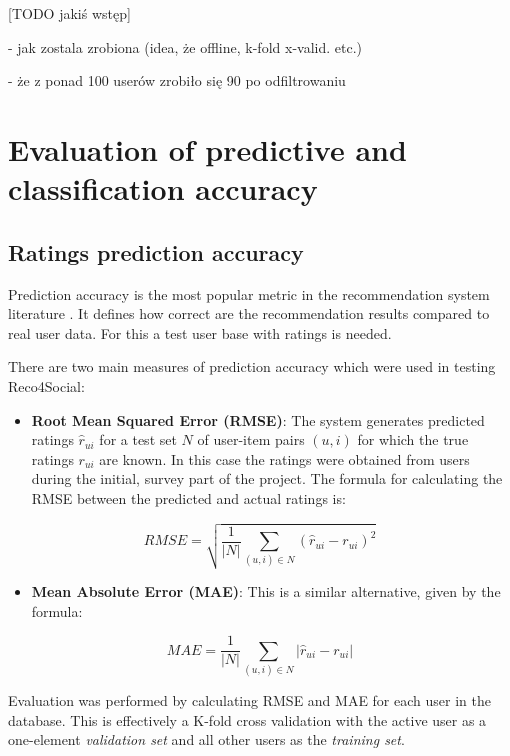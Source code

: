 \documentclass[12pt]{report}
\begin{document}
[TODO jakiś wstęp]

- jak zostala zrobiona (idea, że offline, k-fold x-valid. etc.)

- że z ponad 100 userów zrobiło się 90 po odfiltrowaniu

\section{Evaluation of predictive and classification accuracy}

\subsection{Ratings prediction accuracy}

Prediction accuracy is the most popular metric in the recommendation system literature \cite{eval_microsoft}. It defines how correct are the recommendation results compared to real user data. For this a test user base with ratings is needed. 

There are two main measures of prediction accuracy which were used in testing Reco4Social:
\begin{itemize}
\item {\bf Root Mean Squared Error (RMSE)}: The system generates predicted ratings $\hat{r}_{ui}$ for a test set $N$ of user-item pairs $(u,i)$ for which the true ratings $r_{ui}$ are known. In this case the ratings were obtained from users during the initial, survey part of the project. The formula for calculating the RMSE between the predicted and actual ratings is:
\end{itemize}

\begin{equation}
RMSE = \sqrt{\frac{1}{|N|} \displaystyle\sum_{(u,i) \in N} (\hat{r}_{ui} - r_{ui})^2 }
\label{eq.rmse}
\end{equation}
\hbox{}

\begin{itemize}
\item {\bf Mean Absolute Error (MAE)}: This is a similar alternative, given by the formula:
\end{itemize}

\begin{equation}
MAE = \frac{1}{|N|} \displaystyle\sum_{(u,i) \in N} |\hat{r}_{ui} - r_{ui}|
\label{eq.mae}
\end{equation}
\hbox{}

Evaluation was performed by calculating RMSE and MAE for each user in the database. This is effectively a K-fold cross validation with the active user as a one-element \textit{validation set} and all other users as the \textit{training set}.
\end{document}
